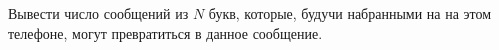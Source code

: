 Вывести число сообщений из $N$ букв, которые, будучи набранными на на этом
телефоне, могут превратиться в данное сообщение.